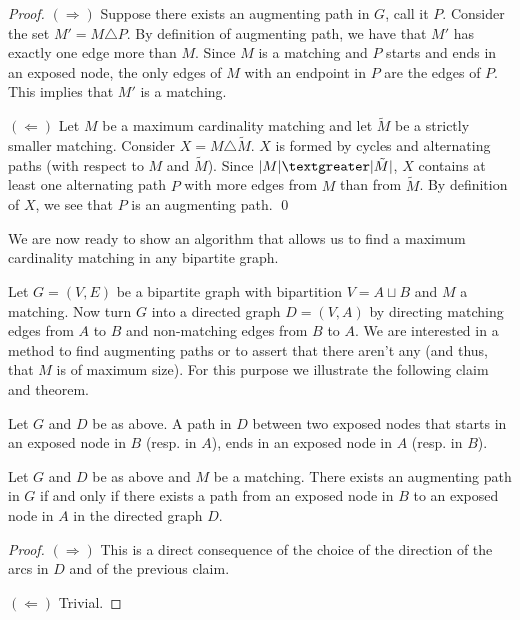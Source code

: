 \begin{proof}
   $(\Rightarrow)$ Suppose there exists an augmenting path in
   $G$, call it $P$. Consider the set $M' = M \triangle P$.
   By definition of augmenting path, we have that $M'$ has
   exactly one edge more than $M$. Since $M$ is a matching
   and $P$ starts and ends in an exposed node, the only edges
   of $M$ with an endpoint in $P$ are the edges of $P$. This implies
   that $M'$ is a matching.
   
   $(\Leftarrow)$ Let $M$ be a maximum cardinality matching
   and let $\tilde{M}$ be a strictly smaller matching.
   Consider $X=M \triangle \tilde{M}$. $X$ is formed by
   cycles and alternating paths (with respect to $M$ and
   $\tilde{M}$). Since $ |M| \textgreater
   |\tilde{M}|$, $X$ contains at least one alternating 
   path $P$ with more edges from $M$ than from $\tilde{M}$.
   By definition of $X$, we see that $P$ is an 
   augmenting path. \qed
\end{proof}

We are now ready to show an algorithm that allows us to
find a maximum cardinality matching in any bipartite graph.

Let $G=(V,E)$ be a bipartite graph with bipartition 
$V = A \sqcup B$ and $M$ a matching.
Now turn $G$ into a directed graph $D=(V,A)$ by directing 
matching edges from $A$ to $B$ and non-matching edges from $B$ to $A$.
We are interested in a method to find augmenting paths or to
assert that there aren't any (and thus, that $M$ is of 
maximum size). For this purpose we illustrate the following
claim and theorem.

\begin{claim}
   Let $G$ and $D$ be as above.
   A path in $D$ between two exposed nodes that starts in
   an exposed node in $B$ (resp. in $A$), ends in an exposed 
   node in $A$ (resp. in $B$).   
\end{claim}

\begin{theorem}
   Let $G$ and $D$ be as above and $M$ be a matching.
   There exists an augmenting path in $G$ if and only if 
   there exists a path from an exposed node in $B$ to an
   exposed node in $A$ in the directed graph $D$.
\end{theorem}

\begin{proof}
   $(\Rightarrow)$ This is a direct consequence of the choice
   of the direction of the arcs in $D$ and of the previous 
   claim.
   
   $(\Leftarrow)$ Trivial.
\end{proof}

